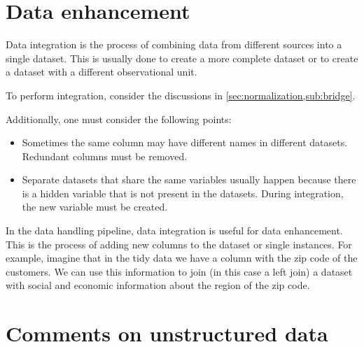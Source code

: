 
\section{Data enhancement}

Data integration is the process of combining data from different sources into a single
dataset.  This is usually done to create a more complete dataset or to create a dataset
with a different observational unit.

To perform integration, consider the discussions in \cref{sec:normalization,sub:bridge}.

Additionally, one must consider the following points:
\begin{itemize}
  \item Sometimes the same column may have different names in different datasets.  Redundant
    columns must be removed.
  \item Separate datasets that share the same variables usually happen because there is a
    hidden variable that is not present in the datasets.  During integration, the new
    variable must be created.
\end{itemize}


In the data handling pipeline, data integration is useful for data enhancement.  This is
the process of adding new columns to the dataset or single instances.  For example,
imagine that in the tidy data we have a column with the zip code of the customers.  We can
use this information to join (in this case a left join) a dataset with social and economic
information about the region of the zip code.

\section{Comments on unstructured data}

